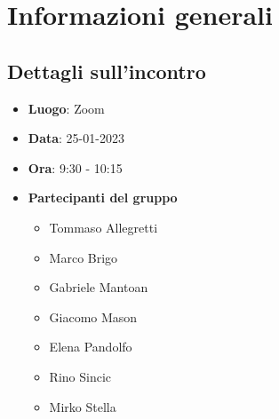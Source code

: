 \section{Informazioni generali}

\subsection{Dettagli sull'incontro}
\begin{itemize}
    \item \textbf{Luogo}: Zoom
    \item \textbf{Data}: 25-01-2023
    \item \textbf{Ora}: 9:30 - 10:15
    \item \textbf{Partecipanti del gruppo}
        \begin{itemize}
            \item Tommaso Allegretti
            \item Marco Brigo
            \item Gabriele Mantoan
            \item Giacomo Mason
            \item Elena Pandolfo
            \item Rino Sincic
            \item Mirko Stella
        \end{itemize}
\end{itemize}

